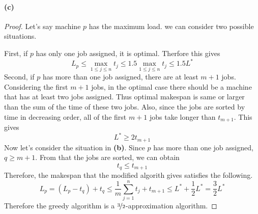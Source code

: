 \documentclass[10pt]{article}
\begin{document}
\paragraph{(c)}
\begin{proof}
    Let's say machine $p$ has the maximum load. we can consider two possible situations. 

    \vspace{0.3cm} First, if $p$ has only one job assigned, it is optimal. Therfore this gives
    $$L_p \leq \max_{1 \leq j \leq n}t_j \leq 1.5\max_{1 \leq j \leq n}t_j \leq 1.5L^*$$
    Second, if $p$ has more than one job assigned, there are at least $m+1$ jobs.
    Considering the first $m+1$ jobs, in the optimal case there should be a machine that has at least two jobs assigned. 
    Thus optimal makespan is same or larger than the sum of the time of these two jobs.
    Also, since the jobs are sorted by time in decreasing order, all of the first $m+1$ jobs take longer than $t_{m+1}$. 
    This gives
    $$L^* \geq 2t_{m+1}$$
    Now let's consider the situation in \textbf{(b)}.
    Since $p$ has more than one job assigned, $q \geq m+1$. From that the jobs are sorted, we can obtain
    $$t_{q} \leq t_{m+1}$$
    Therefore, the makespan that the modified algorith gives satisfies the following.
    $$L_p = (L_p - t_q) + t_q \leq \frac{1}{m}\sum_{j=1}^{n}t_j + t_{m+1} \leq L^* + \frac{1}{2}L^* = \frac{3}{2}L^*$$
    Therefore the greedy algorithm is a $\nicefrac{3}{2}$-approximation algorithm.

\end{proof}
\end{document}
